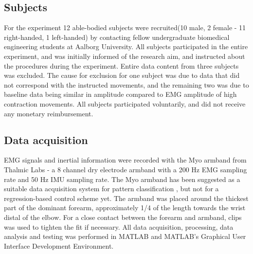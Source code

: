 \subsection{Subjects}
For the experiment 12 able-bodied subjects were recruited(10 male, 2 female - 11 right-handed, 1 left-handed) by contacting fellow undergraduate biomedical engineering students at Aalborg University. All subjects participated in the entire experiment, and was initially informed of the research aim, and instructed about the procedures during the experiment. Entire data content from three subjects was excluded. The cause for exclusion for one subject was due to data that did not correspond with the instructed movements, and the remaining two was due to baseline data being similar in amplitude compared to EMG amplitude of high contraction movements. All subjects participated voluntarily, and did not receive any monetary reimbursement. 

\subsection{Data acquisition}
EMG signals and inertial information were recorded with the Myo armband from Thalmic Labs - a 8 channel dry electrode armband with a 200 Hz EMG sampling rate and 50 Hz IMU sampling rate. The Myo armband has been suggested as a suitable data acquisition system for pattern classification \cite{Mendez2017}, but not for a regression-based control scheme yet. 
The armband was placed around the thickest part of the dominant forearm, approximately 1/4 of the length towards the wrist distal of the elbow. For a close contact between the forearm and armband, clips was used to tighten the fit if necessary. All data acquisition, processing, data analysis and testing was performed in MATLAB and MATLAB's Graphical User Interface Development Environment.

